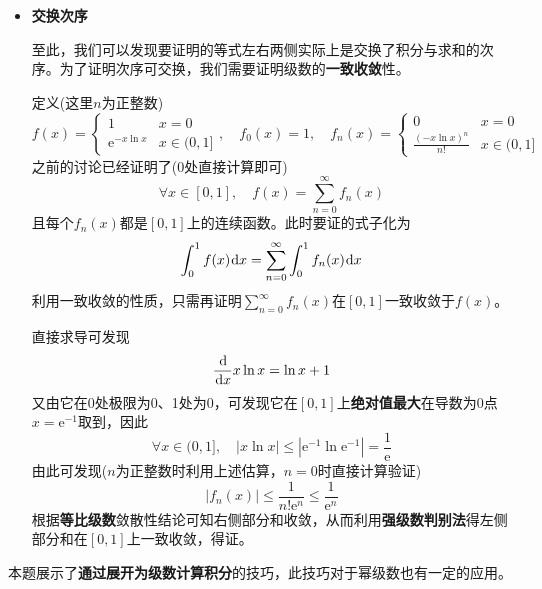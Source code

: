 \documentclass[a4paper,UTF8,fontset=windows,AutoFakeBold]{ctexart}
\newcommand*{\dr}{\hspace{0.07em}\mathrm{d}}
\newcommand*{\er}{\mathrm{e}}
\newcommand*{\suminf}[1][n=1]{\sum_{#1}^\infty}
\newcommand*{\note}{\noindent *}
\theoremstyle{ex}
\begin{document}
\begin{framed}
{\begin{itemize}
        \item \textbf{交换次序}

        至此，我们可以发现要证明的等式左右两侧实际上是交换了积分与求和的次序。为了证明次序可交换，我们需要证明级数的\textbf{一致收敛}性。

        定义(这里$n$为正整数)
        $$f(x)=\begin{cases}1&x=0\\\er^{-x\ln x}&x\in(0,1]\end{cases},\quad f_0(x)=1,\quad f_n(x)=\begin{cases}0&x=0\\\frac{(-x\ln x)^n}{n!}&x\in(0,1]\end{cases}$$
        之前的讨论已经证明了(0处直接计算即可)
        $$\forall x\in[0,1],\quad f(x)=\suminf[n=0]f_n(x)$$
        且每个$f_n(x)$都是$[0,1]$上的连续函数。此时要证的式子化为
        $$\int_0^1f(x)\dr x=\suminf[n=0]\int_0^1f_n(x)\dr x$$
        利用一致收敛的性质，只需再证明$\suminf[n=0]f_n(x)$在$[0,1]$一致收敛于$f(x)$。

        直接求导可发现
        $$\frac{\dr}{\dr x}x\ln x=\ln x+1$$
        又由它在0处极限为0、1处为0，可发现它在$[0,1]$上\textbf{绝对值最大}在导数为0点$x=\er^{-1}$取到，因此
        $$\forall x\in(0,1],\quad |x\ln x|\le|\er^{-1}\ln\er^{-1}|=\frac{1}{\er}$$
        由此可发现($n$为正整数时利用上述估算，$n=0$时直接计算验证)
        $$|f_n(x)|\le\frac{1}{n!\er^n}\le\frac{1}{\er^n}$$
        根据\textbf{等比级数}敛散性结论可知右侧部分和收敛，从而利用\textbf{强级数判别法}得左侧部分和在$[0,1]$上一致收敛，得证。
    \end{itemize}
}
\end{framed}

\note 本题展示了\textbf{通过展开为级数计算积分}的技巧，此技巧对于幂级数也有一定的应用。
\end{document}
